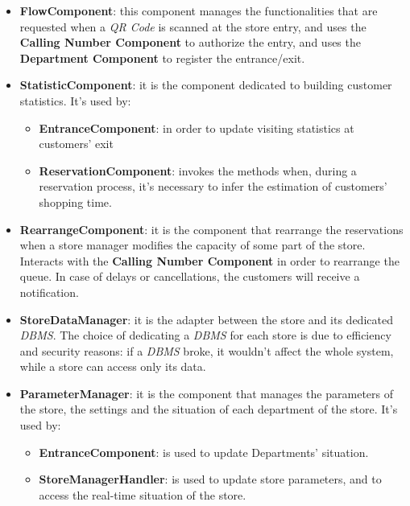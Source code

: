 \documentclass{article}
\begin{document}
			\begin{itemize}
				\item {\bfseries FlowComponent}: this component manages the functionalities that are requested when a \emph{QR Code} is scanned at the store entry, and uses the {\bfseries Calling Number Component} to authorize the entry, and uses the {\bfseries Department Component} to register the entrance/exit.
				
				\item {\bfseries StatisticComponent}: it is the component dedicated to building customer statistics. It’s used by:
				
				\begin{itemize}
					\item {\bfseries EntranceComponent}: in order to update visiting statistics at customers’ exit
					\item {\bfseries ReservationComponent}: invokes the methods when, during a reservation process, it’s necessary to infer the estimation of customers’ shopping time.
				\end{itemize}
			
				\item {\bfseries RearrangeComponent}: it is the component that rearrange the reservations when a store manager modifies the capacity of some part of the store. Interacts with the {\bfseries Calling Number Component} in order to rearrange the queue. In case of delays or cancellations, the customers will receive a notification.
				
				\item {\bfseries StoreDataManager}: it is the adapter between the store and its dedicated \emph{DBMS}. The choice of dedicating a \emph{DBMS} for each store is due to efficiency and security reasons: if a \emph{DBMS} broke, it wouldn't affect the whole system, while a store can access only its data.
				
				\item {\bfseries ParameterManager}: it is the component that manages the parameters of the store, the settings and the situation of each department of the store. It’s used by:
				
				\begin{itemize}
					\item {\bfseries EntranceComponent}: is used to update Departments’ situation.
					\item {\bfseries StoreManagerHandler}: is used to update store parameters, and to access the real-time situation of the store.
				\end{itemize}
			

\end{itemize}
\end{document}
